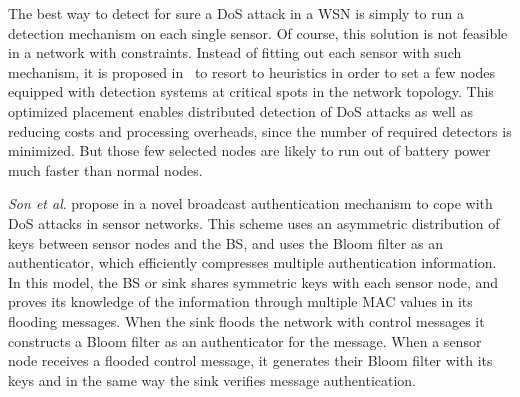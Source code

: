 
The best way to detect for sure a DoS attack in a WSN is simply to run a detection mechanism on each single sensor.
Of course, this solution is not feasible in a network with constraints.
Instead of fitting out each sensor with such mechanism, it is proposed in~\cite{INK09} to resort to heuristics in order to set a few nodes equipped with detection systems at critical spots in the network topology.
This optimized placement enables distributed detection of DoS attacks as well as reducing costs and processing overheads, since the number of required detectors is minimized.
But those few selected nodes are likely to run out of battery power much faster than normal nodes.



\textit{Son et al}. propose in
\cite{JS10}
a novel broadcast authentication mechanism to cope with DoS attacks in sensor networks.
This scheme uses an asymmetric distribution of keys between sensor nodes and the BS, and uses the Bloom filter as an authenticator, which efficiently compresses multiple authentication information.
In this model, the BS or sink shares symmetric keys with each sensor node, and proves its knowledge of the information through multiple MAC values in its flooding messages.
When the sink floods the network with control messages it constructs a Bloom filter as an authenticator for the message.
When a sensor node receives a flooded control message, it generates their Bloom filter with its keys and in the same way the sink verifies message authentication.

